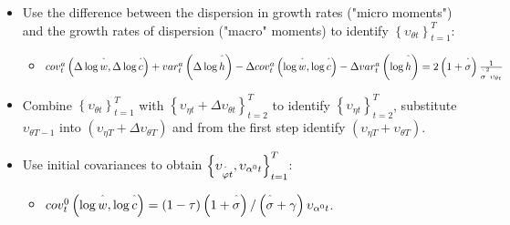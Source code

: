 \documentclass[notes=show]{beamer}
\begin{document}
\bigskip

\begin{frame}%


\begin{itemize}
\item Use the difference between the dispersion in growth rates ("micro
moments") and the growth rates of dispersion ("macro" moments) to identify $%
\left\{ \upsilon _{\theta t}\right\} _{t=1}^{T}$:

\begin{itemize}
\item $cov_{t}^{a}\left( \Delta \log \overset{\symbol{94}}{w},\Delta \log 
\overset{\symbol{94}}{c}\right) +var_{t}^{a}\left( \Delta \log \overset{%
\symbol{94}}{h}\right) -\Delta cov_{t}^{a}\left( \log \overset{\symbol{94}}{w%
},\log \overset{\symbol{94}}{c}\right) -\Delta var_{t}^{a}\left( \log 
\overset{\symbol{94}}{h}\right) =2\left( 1+\overset{\symbol{94}}{\sigma }%
\right) \frac{1}{\overset{\symbol{94}}{\sigma }^{2}\upsilon _{\theta t}}$
\end{itemize}

\item Combine $\left\{ \upsilon _{\theta t}\right\} _{t=1}^{T}$ with $%
\left\{ \upsilon _{\eta t}+\Delta \upsilon _{\theta t}\right\} _{t=2}^{T}$
to identify $\left\{ \upsilon _{\eta t}\right\} _{t=2}^{T}$, substitute $%
\upsilon _{\theta T-1}$ into $\left( \upsilon _{\eta T}+\Delta \upsilon
_{\theta T}\right) $ and from the first step identify $\left( \upsilon
_{\eta T}+\upsilon _{\theta T}\right) $.

\item Use initial covariances to obtain $\left\{ \upsilon _{\overset{\symbol{%
94}}{\varphi }t},\upsilon _{\alpha ^{0}t}\right\} _{t=1}^{T}$:

\begin{itemize}
\item $cov_{t}^{0}\left( \log \overset{\symbol{94}}{w},\log \overset{\symbol{%
94}}{c}\right) =\left( 1-\tau \right) \left( 1+\overset{\symbol{94}}{\sigma }%
\right) /\left( \overset{\symbol{94}}{\sigma }+\gamma \right) \upsilon
_{\alpha ^{0}t}$.
\end{itemize}
\end{itemize}

\transboxout%
\end{frame}%
\end{document}
